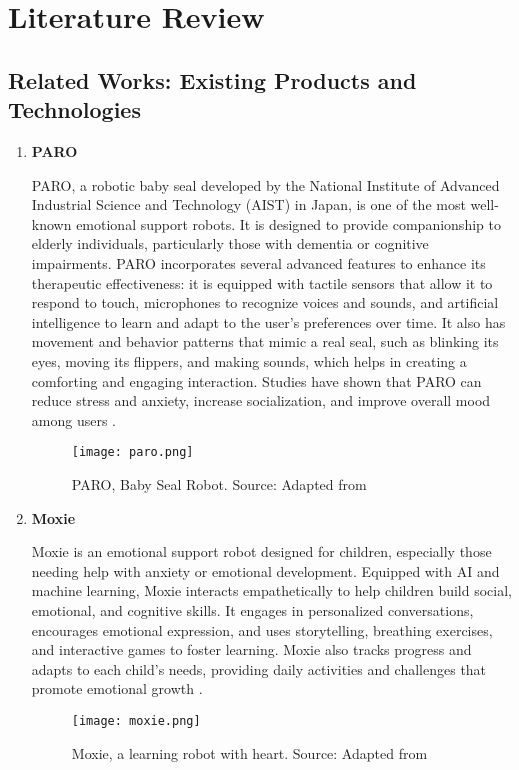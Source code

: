 \section{Literature Review}

\subsection{Related Works: Existing Products and Technologies}

\begin{enumerate}


\item{\bf{PARO}}
\vspace{0.25cm}

PARO, a robotic baby seal developed by the National Institute of Advanced Industrial Science and Technology (AIST) in Japan, is one of the most well-known emotional support robots. It is designed to provide companionship to elderly individuals, particularly those with dementia or cognitive impairments. PARO incorporates several advanced features to enhance its therapeutic effectiveness: it is equipped with tactile sensors that allow it to respond to touch, microphones to recognize voices and sounds, and artificial intelligence to learn and adapt to the user’s preferences over time. It also has movement and behavior patterns that mimic a real seal, such as blinking its eyes, moving its flippers, and making sounds, which helps in creating a comforting and engaging interaction. Studies have shown that PARO can reduce stress and anxiety, increase socialization, and improve overall mood among users \cite{1642310}.


\begin{figure}[ht]
    \centering
    \texttt{[image: paro.png]}
    \caption{PARO, Baby Seal Robot. Source: Adapted from \cite{1642310}}
    \label{fig:paro}
\end{figure}

\item{\bf{Moxie}}
\vspace{0.25cm}

Moxie is an emotional support robot designed for children, especially those needing help with anxiety or emotional development. Equipped with AI and machine learning, Moxie interacts empathetically to help children build social, emotional, and cognitive skills. It engages in personalized conversations, encourages emotional expression, and uses storytelling, breathing exercises, and interactive games to foster learning. Moxie also tracks progress and adapts to each child’s needs, providing daily activities and challenges that promote emotional growth \cite{hurst2020socialemotionalskillstraining}.

\begin{figure}[ht]
    \centering
    \texttt{[image: moxie.png]}
    \caption{Moxie, a learning robot with heart. Source: Adapted from \cite{hurst2020socialemotionalskillstraining}}
    \label{fig:moxie}
\end{figure}

\end{enumerate}
\newpage
